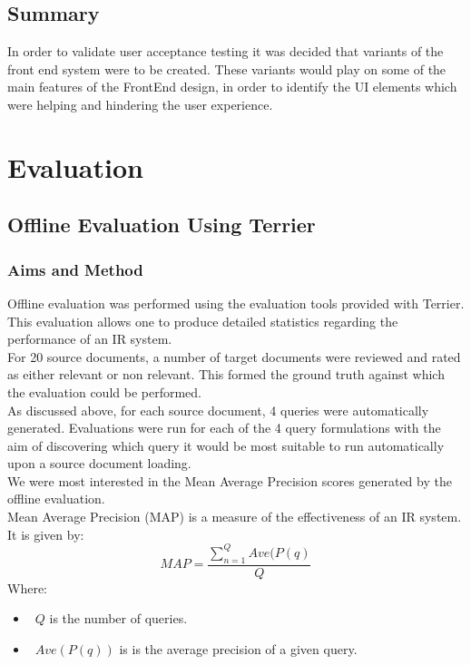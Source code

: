 \documentclass{l4proj}
\begin{document}
\section{Summary}
In order to validate user acceptance testing it was decided that variants of the front end system were to be created. These variants would play on some of the main features of the FrontEnd design, in order to identify the UI elements which were helping and hindering the user experience.

\chapter{Evaluation}
\section{Offline Evaluation Using Terrier}
\subsection{Aims and Method}
Offline evaluation was performed using the evaluation tools provided with Terrier. This evaluation allows one to produce detailed statistics regarding the performance of an IR system.\\
For 20 source documents, a number of target documents were reviewed and rated as either relevant or non relevant. This formed the ground truth against which the evaluation could be performed.\\
As discussed above, for each source document, 4 queries were automatically generated. Evaluations were run for each of the 4 query formulations with the aim of discovering which query it would be most suitable to run automatically upon a source document loading.\\
We were most interested in the Mean Average Precision scores generated by the offline evaluation.\\
Mean Average Precision (MAP) is a measure of the effectiveness of an IR system.
It is given by:
\begin{displaymath}
  MAP=\frac{\sum_{n=1}^{Q} Ave(P(q)}{Q}
\end{displaymath}
Where: 
\begin{itemize}
\item{~$Q$ is the number of queries.}
\item{~$Ave(P(q))$ is is the average precision of a given query.}
\end{itemize}
\end{document}

